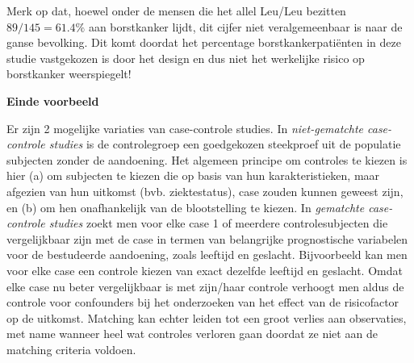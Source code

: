 \documentclass[
  dutch,
  letterpaper,
  12pt]{book}
\theoremstyle{definition}
\theoremstyle{definition}
\theoremstyle{definition}
\theoremstyle{remark}
\begin{document}
Merk op dat, hoewel onder de mensen die het allel Leu/Leu bezitten
\(89/145=61.4\%\) aan borstkanker lijdt, dit cijfer niet veralgemeenbaar
is naar de ganse bevolking. Dit komt doordat het percentage
borstkankerpatiënten in deze studie vastgekozen is door het design en
dus niet het werkelijke risico op borstkanker weerspiegelt!

\begin{table}

\caption{\label{tbl-leu}}


\end{table}%

\textbf{Einde voorbeeld}

Er zijn 2 mogelijke variaties van case-controle studies. In
\emph{niet-gematchte case-controle studies} is de controlegroep een
goedgekozen steekproef uit de populatie subjecten zonder de aandoening.
Het algemeen principe om controles te kiezen is hier (a) om subjecten te
kiezen die op basis van hun karakteristieken, maar afgezien van hun
uitkomst (bvb. ziektestatus), case zouden kunnen geweest zijn, en (b) om
hen onafhankelijk van de blootstelling te kiezen. In \emph{gematchte
case-controle studies} zoekt men voor elke case 1 of meerdere
controlesubjecten die vergelijkbaar zijn met de case in termen van
belangrijke prognostische variabelen voor de bestudeerde aandoening,
zoals leeftijd en geslacht. Bijvoorbeeld kan men voor elke case een
controle kiezen van exact dezelfde leeftijd en geslacht. Omdat elke case
nu beter vergelijkbaar is met zijn/haar controle verhoogt men aldus de
controle voor confounders bij het onderzoeken van het effect van de
risicofactor op de uitkomst. Matching kan echter leiden tot een groot
verlies aan observaties, met name wanneer heel wat controles verloren
gaan doordat ze niet aan de matching criteria voldoen.
\end{document}
